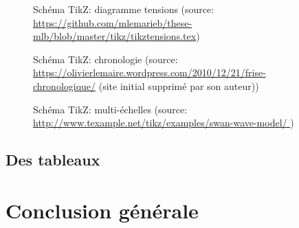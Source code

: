 \lipsum[19]

\begin{figure}
\centering

\caption[Schéma TikZ: tensions]{Schéma TikZ: diagramme tensions (source: \url{https://github.com/mlemarieb/these-mlb/blob/master/tikz/tikztensions.tex})}\label{fig:tikztensions}
\end{figure}

\lipsum[20]

\lipsum[21]

\begin{figure}

\caption[Schéma TikZ: chronologie]{Schéma TikZ: chronologie (source: \url{https://olivierlemaire.wordpress.com/2010/12/21/frise-chronologique/} (site initial supprimé par son auteur)) 
}\label{fig:tikztemps}
\end{figure}

\begin{figure}

\caption[Schéma TikZ: multi-échelles]{Schéma TikZ: multi-échelles (source: \url{http://www.texample.net/tikz/examples/swan-wave-model/
})}\label{fig:tikzsources}
\end{figure}

\lipsum[22]

\lipsum[23]

\section[Des tableaux ]{Des tableaux}\label{sec:24}

\lipsum[24]



\lipsum[25]



\cleardoublepage 
{}
{}
\chapter*{Conclusion générale \label{chap:conclu}}
\lipsum[5-6]

\appendix
\cleardoublepage 


\backmatter
\cleardoublepage 
\pagestyle{scrheadings} 



